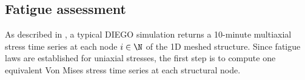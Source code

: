%

\subsection{Fatigue assessment}
As described in , a typical DIEGO simulation returns a 10-minute multiaxial stress time series at each node $i \in \N$ of the 1D meshed structure. 
Since fatigue laws are established for uniaxial stresses, the first step is to compute one equivalent Von Mises stress time series at each structural node.

